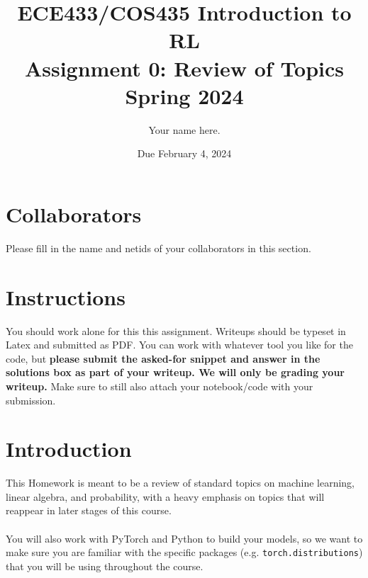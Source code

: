 \documentclass[12pt]{article}
\title{ECE433/COS435 Introduction to RL\\
  Assignment 0: Review of Topics\\
  Spring 2024\\
}
\date{Due February 4, 2024}
\author{\begin{fillme}[width=0.3\textwidth]
 Your name here.
\end{fillme}} %
\begin{document}
\maketitle
\noindent

\section*{Collaborators}
\begin{fillme}
 Please fill in the name and netids of your collaborators in this section.
\end{fillme}

\section*{Instructions}

You should work alone for this this assignment. Writeups should be typeset in Latex and submitted as PDF. You can work with whatever tool you like for the code, but \textbf{please submit the asked-for snippet and answer in the solutions box as part of your writeup. We will only be grading your writeup.} Make sure to still also attach your notebook/code with your submission.

\section*{Introduction}
This Homework is meant to be a review of standard topics on machine learning, linear algebra, and probability, with a heavy emphasis on topics that will reappear in later stages of this course. 
\\\\
You will also work with PyTorch and Python to build your models, so we want to make sure you are familiar with the specific packages (e.g. \texttt{torch.distributions}) that you will be using throughout the course.
\newpage

\end{document}
